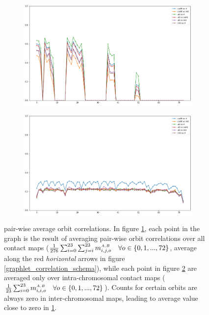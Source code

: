 \documentclass[a4,center,fleqn]{NAR}
\begin{document}
\begin{figure}[t]
    \centering
    \begin{subfigure}[b]{\textwidth}
        \includegraphics[width=\textwidth, height=.2\paperheight]{figures/orbits_correlations_all.png}
        \caption{}
        \label{fig:orbits_correlations_all}
    \end{subfigure}
    \begin{subfigure}[b]{\textwidth}
        \includegraphics[width=\textwidth, height=.2\paperheight]{figures/orbits_correlations_intra.png}
        \caption{}
        \label{fig:orbits_correlations_intra}
    \end{subfigure}
    \caption{pair-wise average orbit correlations.
             In figure \ref{fig:orbits_correlations_all}, each point
             in the graph is the result of averaging pair-wise
             orbit correlations over all contact maps
             ($\frac{1}{276}\sum_{i=0}^{23}\sum_{j=i}^{23}{
             m^{\scriptscriptstyle \scriptscriptstyle A,B}_{i,j, o}} \quad 
             \forall o \in \{0, 1, ..., 72\}$,
             average along the red \textit{horizontal} arrows in figure 
             \ref{graphlet_correlation_schema}), while
             each point in figure \ref{fig:orbits_correlations_intra}
             are averaged only over intra-chromosomal contact maps
             ($\frac{1}{23}\sum_{i=0}^{23}{
             m^{\scriptscriptstyle \scriptscriptstyle A,B}_{i,i, o}} \quad 
         \forall o \in \{0, 1, ..., 72\}$).
             Counts for certain orbits are always zero in inter-chromosomal
             maps, leading to average value close to zero in 
             \ref{fig:orbits_correlations_all}.
             }
    \label{fig:orbits_correlations}
\end{figure}
\end{document}
